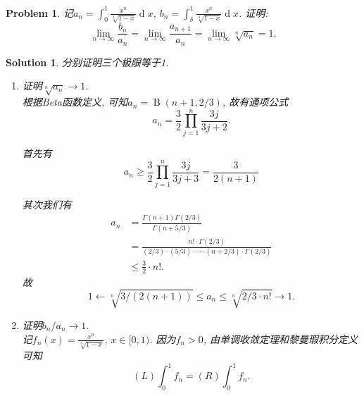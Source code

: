 \documentclass[a4paper, 12pt]{ctexart}
\theoremstyle{plain}
\newtheorem{problem}{Problem}[section]
\theoremstyle{plain}
\theoremstyle{plain}
\theoremstyle{nonumberplain}
\newtheorem{solution}{Solution}
\DeclareMathOperator{\Beta}{B}
\DeclareMathOperator{\diff}{d}
\begin{document}
    \begin{problem}
        记$\displaystyle a_n=\int_{0}^{1}{\frac{x^n}{\sqrt[3]{1-x}}\diff x}$,
        $\displaystyle b_n=\int_{\delta}^{1}{\frac{x^n}{\sqrt[3]{1-x}}\diff x}$.
        证明:
        \[\lim_{n\to \infty}{\frac{b_n}{a_n}}=
        \lim_{n\to \infty}{\frac{a_{n+1}}{a_n}}=
        \lim_{n\to \infty}{\sqrt[n]{a_n}}=1.\]
    \end{problem}

    \begin{solution}
        分别证明三个极限等于1.

        \begin{enumerate}[Step i.]
            \item

            证明$\sqrt[n]{a_n}\to 1$.\\
            根据Beta函数定义, 可知$a_n=\Beta(n+1, 2/3)$, 故有通项公式
            \begin{equation}
                a_n = \frac{3}{2}\prod_{j=1}^{n}{\frac{3j}{3j+2}}.
            \end{equation}

            首先有
            \begin{equation}
                \label{angeq}
                a_n
                \geq \frac{3}{2}\prod_{j=1}^{n}{\frac{3j}{3j+3}}
                = \frac{3}{2(n+1)}
            \end{equation}

            其次我们有
            \begin{equation}
            \begin{aligned}
                a_n &= \frac{\Gamma(n+1)\Gamma(2/3)}{\Gamma(n+5/3)}\\
                &= \frac{n!\cdot\Gamma(2/3)}{(2/3)\cdot(5/3)\cdot\dotsm
                    \cdot(n+2/3)\cdot\Gamma(2/3)}\\
                &\leq \frac{3}{2}\cdot n!.
            \end{aligned}
            \end{equation}
            故
            \begin{equation}
                1\leftarrow \sqrt[n]{3/(2(n+1))} \leq a_n
                    \leq \sqrt[n]{2/3\cdot n!} \to 1.
            \end{equation}

            \item

            证明$b_n/a_n\to 1.$\\
            记$\displaystyle f_n(x)=\frac{x^n}{\sqrt[3]{1-x}}$, $x\in [0, 1)$.
            因为$f_n>0$, 由单调收敛定理和黎曼瑕积分定义可知
            \begin{equation}
                (L)\int_{0}^{1}f_n = (R)\int_{0}^{1}f_n.
            \end{equation}


\end{enumerate}
\end{solution}
\end{document}

